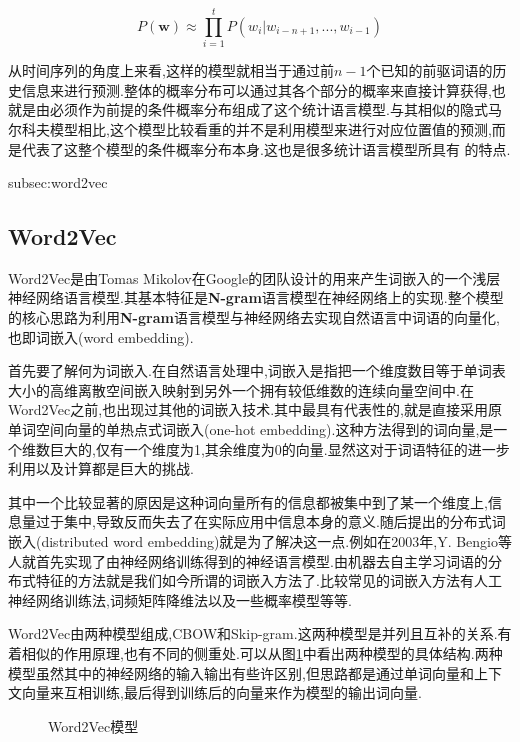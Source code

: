 \begin{equation}
	P(\mathbf{w}) \approx \prod_{i=1}^{t}P(w_i|w_{i-n+1},...,w_{i-1})
\end{equation}

从时间序列的角度上来看,这样的模型就相当于通过前$n-1$个已知的前驱词语的历史信息来进行预测.整体的概率分布可以通过其各个部分的概率来直接计算获得,也就是由必须作为前提的条件概率分布组成了这个统计语言模型.与其相似的隐式马尔科夫模型相比,这个模型比较看重的并不是利用模型来进行对应位置值的预测,而是代表了这整个模型的条件概率分布本身.这也是很多统计语言模型所具有 的特点.

subsec:word2vec\subsection{Word2Vec}
\label{subsec:word2vec}

Word2Vec是由Tomas Mikolov在Google的团队设计的用来产生词嵌入的一个浅层神经网络语言模型.其基本特征是\textbf{N-gram}语言模型在神经网络上的实现.整个模型的核心思路为利用\textbf{N-gram}语言模型与神经网络去实现自然语言中词语的向量化,也即词嵌入(word embedding).

首先要了解何为词嵌入.在自然语言处理中,词嵌入是指把一个维度数目等于单词表大小的高维离散空间嵌入映射到另外一个拥有较低维数的连续向量空间中.在Word2Vec之前,也出现过其他的词嵌入技术.其中最具有代表性的,就是直接采用原单词空间向量的单热点式词嵌入(one-hot embedding).这种方法得到的词向量,是一个维数巨大的,仅有一个维度为1,其余维度为0的向量.显然这对于词语特征的进一步利用以及计算都是巨大的挑战.

其中一个比较显著的原因是这种词向量所有的信息都被集中到了某一个维度上,信息量过于集中,导致反而失去了在实际应用中信息本身的意义.随后提出的分布式词嵌入(distributed word embedding)就是为了解决这一点.例如在2003年,Y. Bengio等人就首先实现了由神经网络训练得到的神经语言模型\cite{bengio2003neural}.由机器去自主学习词语的分布式特征的方法就是我们如今所谓的词嵌入方法了.比较常见的词嵌入方法有人工神经网络训练法,词频矩阵降维法以及一些概率模型等等.

Word2Vec由两种模型组成,CBOW和Skip-gram.这两种模型是并列且互补的关系.有着相似的作用原理,也有不同的侧重处.可以从图\ref{fig:word2vecmodel}中看出两种模型的具体结构.两种模型虽然其中的神经网络的输入输出有些许区别,但思路都是通过单词向量和上下文向量来互相训练,最后得到训练后的向量来作为模型的输出词向量.

\begin{figure}
  \centering
  \hspace{1in}
  \caption[Word2Vec模型]{Word2Vec模型}
  \label{fig:word2vecmodel}
\end{figure}


